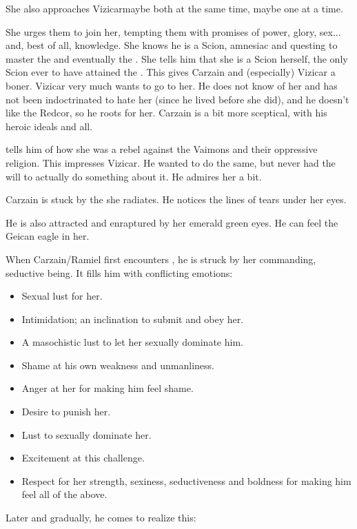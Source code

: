 \begin{garbage}
She also approaches Vizicar\dash maybe both at the same time, maybe one at a time. 

She urges them to join her, tempting them with promises of power, glory, sex... and, best of all, knowledge. 
She knows he is a Scion, amnesiac and questing to master the \hs{\Kenosis} and eventually the \hs{\Apotheosis}. 
She tells him that she is a Scion herself, the only Scion ever to have attained the \hs{\Apotheosis}. 
This gives Carzain and (especially) Vizicar a boner. 
Vizicar very much wants to go to her. 
He does not know of her and has not been indoctrinated to hate her (since he lived before she did), and he doesn't like the Redcor, so he roots for her. 
Carzain is a bit more sceptical, with his heroic ideals and all. 

\Belzir{} tells him of how she was a rebel against the Vaimons and their oppressive religion. 
This impresses Vizicar. 
He wanted to do the same, but never had the will to actually do something about it. 
He admires her a bit. 

Carzain is stuck by the  she radiates. 
He notices the lines of tears under her eyes.

He is also attracted and enraptured by her emerald green eyes. 
He can feel the Geican eagle in her. 

When Carzain/Ramiel first encounters \Belzir, he is struck by her commanding, seductive being. 
It fills him with conflicting emotions: 
\begin{itemize}
  \item Sexual lust for her. 
  \item Intimidation; an inclination to submit and obey her. 
  \item A masochistic lust to let her sexually dominate him. 
  \item Shame at his own weakness and unmanliness. 
  \item Anger at her for making him feel shame. 
  \item Desire to punish her. 
  \item Lust to sexually dominate her. 
  \item Excitement at this challenge. 
  \item Respect for her strength, sexiness, seductiveness and boldness for making him feel all of the above. 
\end{itemize}

Later and gradually, he comes to realize this: 
\begin{prose}
\end{prose}
\end{garbage}
